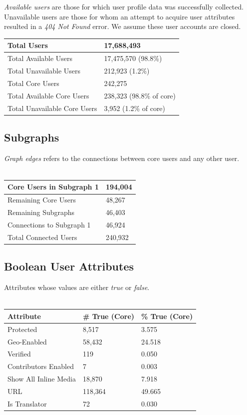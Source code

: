 
\textit{Available users} are those for which user profile data was successfully collected.  Unavailable users are those for whom an attempt to acquire user attributes resulted in a \textit{404 Not Found} error.  We assume these user accounts are closed.\\ 
\begin{tabular}[t]{| l | l |}
\hline
Total Users & 17,688,493  \\ \hline
Total Available Users & 17,475,570 (98.8\%) \\ \hline
Total Unavailable Users & 212,923 (1.2\%) \\ \hline
Total Core Users & 242,275 \\ \hline
Total Available Core Users & 238,323 (98.8\% of core) \\ \hline
Total Unavailable Core Users & 3,952 (1.2\% of core) \\ \hline
\end{tabular}

\subsection{Subgraphs}
\textit{Graph edges} refers to the connections between core users and any other user.\\\\
\begin{tabular}{| l | l | }
\hline
Core Users in Subgraph 1  & 194,004 \\ \hline
Remaining Core Users  & 48,267 \\ \hline
Remaining Subgraphs  & 46,403 \\ \hline
Connections to Subgraph 1  & 46,924 \\ \hline
Total Connected Users & 240,932 \\ \hline
\end{tabular}

\subsection{Boolean User Attributes}
Attributes whose values are either \textit{true} or \textit{false}.\\\\
\begin{tabular}{| l | l | l |}
\hline
\textbf{Attribute} & \textbf{\# True (Core)} & \textbf{\% True (Core)} \\ \hline
Protected & 8,517 & 3.575  \\ \hline
Geo-Enabled & 58,432 & 24.518 \\ \hline
Verified & 119 & 0.050 \\ \hline
Contributors Enabled & 7 & 0.003 \\ \hline
Show All Inline Media & 18,870 & 7.918 \\ \hline
URL & 118,364 & 49.665 \\ \hline
Is Translator & 72 & 0.030 \\ \hline
\end{tabular}

